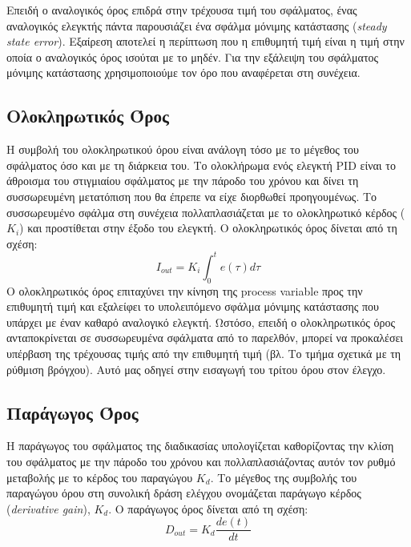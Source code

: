 Επειδή ο αναλογικός όρος επιδρά στην τρέχουσα τιμή του σφάλματος, ένας αναλογικός ελεγκτής πάντα παρουσιάζει ένα σφάλμα μόνιμης κατάστασης (\emph{steady state error}). Εξαίρεση αποτελεί η περίπτωση που η επιθυμητή τιμή είναι η τιμή στην οποία ο αναλογικός όρος ισούται με το μηδέν. Για την εξάλειψη του σφάλματος μόνιμης κατάστασης χρησιμοποιούμε τον όρο που αναφέρεται στη συνέχεια.

\subsection{Ολοκληρωτικός Όρος}

Η συμβολή του ολοκληρωτικού όρου είναι ανάλογη τόσο με το μέγεθος του σφάλματος όσο και με τη διάρκεια του. Το ολοκλήρωμα ενός ελεγκτή PID είναι το άθροισμα του στιγμιαίου σφάλματος με την πάροδο του χρόνου και δίνει τη συσσωρευμένη μετατόπιση που θα έπρεπε να είχε διορθωθεί προηγουμένως. Το συσσωρευμένο σφάλμα στη συνέχεια πολλαπλασιάζεται με το ολοκληρωτικό κέρδος ($K_i$) και προστίθεται στην έξοδο του ελεγκτή. Ο ολοκληρωτικός όρος δίνεται από τη σχέση:
\begin{equation}
I_{out}=K_i \int_{0}^{t} e(\tau)d\tau
\label{eq:i_out}
\end{equation}
Ο ολοκληρωτικός όρος επιταχύνει την κίνηση της process variable προς την επιθυμητή τιμή και εξαλείφει το υπολειπόμενο σφάλμα μόνιμης κατάστασης που υπάρχει με έναν καθαρό αναλογικό ελεγκτή. Ωστόσο, επειδή ο ολοκληρωτικός όρος ανταποκρίνεται σε συσσωρευμένα σφάλματα από το παρελθόν, μπορεί να προκαλέσει υπέρβαση της τρέχουσας τιμής από την επιθυμητή τιμή (βλ. Το τμήμα σχετικά με τη ρύθμιση βρόγχου). Αυτό μας οδηγεί στην εισαγωγή του τρίτου όρου στον έλεγχο.

\subsection{Παράγωγος Όρος}

Η παράγωγος του σφάλματος της διαδικασίας υπολογίζεται καθορίζοντας την κλίση του σφάλματος με την πάροδο του χρόνου και πολλαπλασιάζοντας αυτόν τον ρυθμό μεταβολής με το κέρδος του παραγώγου $K_d$. Το μέγεθος της συμβολής του παραγώγου όρου στη συνολική δράση ελέγχου ονομάζεται παράγωγο κέρδος (\emph{derivative gain}), $K_d$. Ο παράγωγος όρος δίνεται από τη σχέση:
\begin{equation}
D_{out}=K_d \frac{de(t)}{dt}
\label{eq:dout}
\end{equation}

